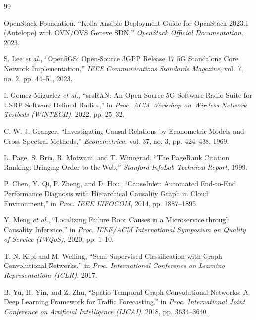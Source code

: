 \begin{thebibliography}{99}

OpenStack Foundation, ``Kolla-Ansible Deployment Guide for OpenStack 2023.1 (Antelope) with OVN/OVS Geneve SDN,'' \textit{OpenStack Official Documentation}, 2023.

S. Lee \textit{et al.}, ``Open5GS: Open-Source 3GPP Release 17 5G Standalone Core Network Implementation,'' \textit{IEEE Communications Standards Magazine}, vol. 7, no. 2, pp. 44--51, 2023.

I. Gomez-Miguelez \textit{et al.}, ``srsRAN: An Open-Source 5G Software Radio Suite for USRP Software-Defined Radios,'' in \textit{Proc. ACM Workshop on Wireless Network Testbeds (WiNTECH)}, 2022, pp. 25--32.

C. W. J. Granger, ``Investigating Causal Relations by Econometric Models and Cross-Spectral Methods,'' \textit{Econometrica}, vol. 37, no. 3, pp. 424--438, 1969.

L. Page, S. Brin, R. Motwani, and T. Winograd, ``The PageRank Citation Ranking: Bringing Order to the Web,'' \textit{Stanford InfoLab Technical Report}, 1999.

P. Chen, Y. Qi, P. Zheng, and D. Hou, ``CauseInfer: Automated End-to-End Performance Diagnosis with Hierarchical Causality Graph in Cloud Environment,'' in \textit{Proc. IEEE INFOCOM}, 2014, pp. 1887--1895.

Y. Meng \textit{et al.}, ``Localizing Failure Root Causes in a Microservice through Causality Inference,'' in \textit{Proc. IEEE/ACM International Symposium on Quality of Service (IWQoS)}, 2020, pp. 1--10.

T. N. Kipf and M. Welling, ``Semi-Supervised Classification with Graph Convolutional Networks,'' in \textit{Proc. International Conference on Learning Representations (ICLR)}, 2017.

B. Yu, H. Yin, and Z. Zhu, ``Spatio-Temporal Graph Convolutional Networks: A Deep Learning Framework for Traffic Forecasting,'' in \textit{Proc. International Joint Conference on Artificial Intelligence (IJCAI)}, 2018, pp. 3634--3640.


\end{thebibliography}
